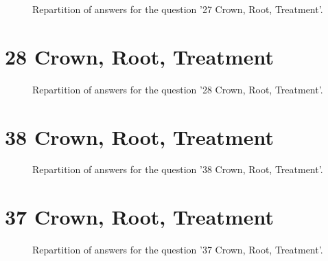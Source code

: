 \documentclass[12pt]{article}
\begin{document}
\begin{figure}[h!]
    \caption{\label{figure:q39-1}Repartition of answers for the question '27
Crown, Root, Treatment'.}
\end{figure}



\clearpage{}
\section{28
Crown, Root, Treatment}

\label{sec:40}


\begin{figure}[h!]
    \caption{\label{figure:q40-1}Repartition of answers for the question '28
Crown, Root, Treatment'.}
\end{figure}



\clearpage{}
\section{38
Crown, Root, Treatment}

\label{sec:56}


\begin{figure}[h!]
    \caption{\label{figure:q56-1}Repartition of answers for the question '38
Crown, Root, Treatment'.}
\end{figure}



\clearpage{}
\section{37
Crown, Root, Treatment}

\label{sec:55}


\begin{figure}[h!]
    \caption{\label{figure:q55-1}Repartition of answers for the question '37
Crown, Root, Treatment'.}
\end{figure}
\end{document}
